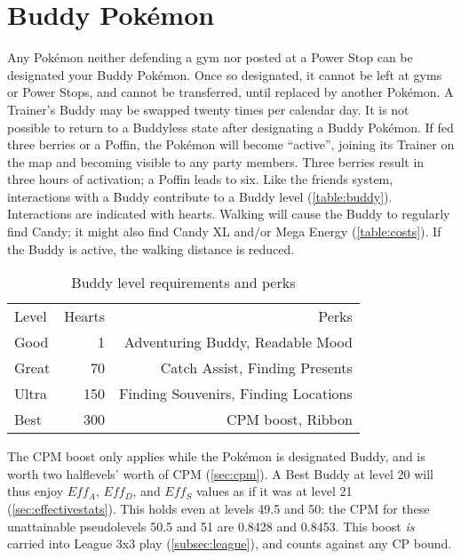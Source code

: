\section{Buddy Pokémon}
\label{sec:buddies}
Any Pokémon neither defending a gym nor posted at a Power Stop can be designated your Buddy Pokémon.
Once so designated, it cannot be left at gyms or Power Stops, and cannot be transferred,
  until replaced by another Pokémon.
A Trainer's Buddy may be swapped twenty times per calendar day.
It is not possible to return to a Buddyless state after designating a Buddy Pokémon.
If fed three berries or a Poffin, the Pokémon will become ``active'',
  joining its Trainer on the map and becoming visible to any party members.
Three berries result in three hours of activation; a Poffin leads to six.
Like the friends system, interactions with a Buddy contribute to a Buddy level (\autoref{table:buddy}).
Interactions are indicated with hearts.
Walking will cause the Buddy to regularly find Candy; it might also find Candy XL
  and/or Mega Energy (\autoref{table:costs}).
If the Buddy is active, the walking distance is reduced.
\begin{table}
\centering
\begin{tabular}{lrr}
Level & Hearts & Perks\\
\Midrule
Good & 1 & Adventuring Buddy, Readable Mood\\
Great & 70 & Catch Assist, Finding Presents\\
Ultra & 150 & Finding Souvenirs, Finding Locations\\
Best & 300 & CPM boost, Ribbon\\
\end{tabular}
\caption{Buddy level requirements and perks}
\label{table:buddy}
\end{table}
The CPM boost only applies while the Pokémon is designated Buddy,
  and is worth two halflevels' worth of CPM (\autoref{sec:cpm}).
A Best Buddy at level 20 will thus enjoy $Eff_A$, $Eff_D$, and $Eff_S$ values
  as if it was at level 21 (\autoref{sec:effectivestats}).
This holds even at levels 49.5 and 50: the CPM for these unattainable
  pseudolevels 50.5 and 51 are 0.8428 and 0.8453.
This boost \textit{is} carried into League 3x3 play (\autoref{subsec:league}),
  and counts against any CP bound.
